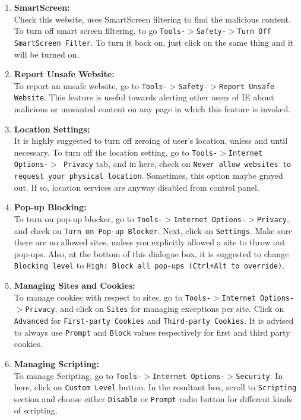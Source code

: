 \documentclass[12pt]{extarticle}
\begin{document}
\begin{enumerate}
\begin{enumerate}
		\item \textbf{SmartScreen:}\\ Check this website, uses SmartScreen filtering to find the malicious content. To turn off smart screen filtering, to go \texttt{Tools-$>$Safety-$>$Turn Off SmartScreen Filter}. To turn it back on, just click on the same thing and it will be turned on.
		
		\item \textbf{Report Unsafe Website:}\\ To report an unsafe website, go to \texttt{Tools-$>$Safety-$>$Report Unsafe Website}. This feature is useful towards alerting other users of IE about malicious or unwanted content on any page in which this feature is invoked.
		
		\item \textbf{Location Settings:}\\ It is highly suggested to turn off zeroing of user's location, unless and until necessary. To turn off the location setting, go to \texttt{Tools-$>$Internet Options-$>$ Privacy} tab, and in here, check on \texttt{Never allow websites to request your physical location}. Sometimes, this option maybe grayed out. If so, location services are anyway disabled from control panel.
		
		\item \textbf{Pop-up Blocking:}\\ To turn on pop-up blocker, go to \texttt{Tools-$>$Internet Options-$>$Privacy}, and check on \texttt{Turn on Pop-up Blocker}. Next, click on \texttt{Settings}. Make sure there are no allowed sites, unless you explicitly allowed a site to throw out pop-ups. Also, at the bottom of this dialogue box, it is suggested to change \texttt{Blocking level} to \texttt{High: Block all pop-ups (Ctrl+Alt to override)}.
		
		\item \textbf{Managing Sites and Cookies:}\\ To manage cookies with respect to sites, go to \texttt{Tools-$>$Internet Options-$>$Privacy}, and click on \texttt{Sites} for managing exceptions per site. Click on \texttt{Advanced} for \texttt{First-party Cookies} and \texttt{Third-party Cookies}. It is advised to always use \texttt{Prompt} and \texttt{Block} values respectively for first and third party cookies.
		
		\item \textbf{Managing Scripting:}\\ To manage Scripting, go to \texttt{Tools-$>$Internet Options-$>$Security}. In here, click on \texttt{Custom Level} button. In the resultant box, scroll to \texttt{Scripting} section and choose either \texttt{Disable} or \texttt{Prompt} radio button for different kinds of scripting.
	\end{enumerate}
	

\end{enumerate}
\end{document}
